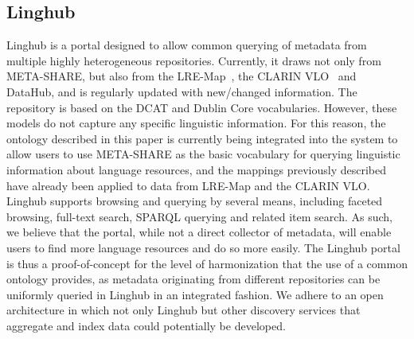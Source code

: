 \documentclass{llncs}
\begin{document}
\subsection{Linghub}

Linghub is a portal designed to allow common querying of metadata from multiple
highly heterogeneous repositories. Currently, it draws not only
from META-SHARE, but also from the LRE-Map~\cite{calzolari2012lre}, the CLARIN
VLO~\cite{broeder2010data} and DataHub, and is regularly updated with new/changed information. The repository is based on the DCAT and Dublin Core vocabularies. However, these models do not capture
any specific linguistic information. For this reason, the ontology described in this paper is currently being integrated into the system to allow users to use META-SHARE as the
basic vocabulary for querying linguistic information about language resources, and the mappings previously
described have already been applied to data from LRE-Map and the CLARIN VLO.
Linghub supports browsing and querying by several means, including faceted
browsing, full-text search, SPARQL querying and related item search. As such, we
believe that the portal, while not a direct collector of metadata, will enable
users to find more language resources and do so more easily.
The Linghub portal is thus a proof-of-concept for the level of
harmonization that the use of a common ontology provides, as metadata
originating from different repositories can be uniformly queried in Linghub in
an integrated fashion. We adhere to an open architecture in which not only
Linghub but other discovery services that aggregate and index data could potentially
be developed.
\end{document}
